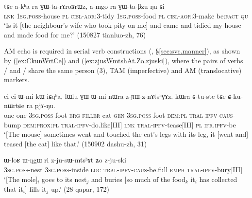 \begin{exe}
\ex \label{ex:GWtaBzu}
\gll  tɕe a-kʰa ra ɣɯ-ta-rɤroʁrɯz, 	a-mgo  ra ɣɯ-ta-βzu ŋu ɕi \\
\textsc{lnk} \textsc{1sg}.\textsc{poss}-house \textsc{pl} \textsc{cisl}-\textsc{aor}:3\flobv{}-tidy 
 \textsc{1sg}.\textsc{poss}-food \textsc{pl} \textsc{cisl}-\textsc{aor}:3\flobv{}-make be:\textsc{fact} \textsc{qu} \\ 
\glt `Is it [the neighbour's wife who took pity on me] and came and tidied my house and made food for me?'  (150827 tianluo-zh, 76)
\end{exe}

AM echo is required in serial verb constructions (\citealt[253--255]{jacques16complementation}, §\ref{sec:svc.manner}), as shown by (\ref{ex:CkunWrtCe}) and (\ref{ex:zjusWmtshAt.Zo.zjuski}), where the pairs of verbs  /  and   /  share the same person (3\flobv{}), TAM (imperfective) and AM (translocative) markers.

\begin{exe}
\ex \label{ex:CkunWrtCe}
\gll  ci ci ɯ-mi kɯ iɕqʰa, lɯlu ɣɯ ɯ-mi nɯra z-ɲɯ-z-nɤtsʰɣɤz. kɯra ɕ-tu-ste tɕe ɕ-ku-nɯrtɕe ra pjɤ-ŋu. \\
one one \textsc{3sg}.\textsc{poss}-foot \textsc{erg} \textsc{filler} cat \textsc{gen} \textsc{3sg}.\textsc{poss}-foot \textsc{dem}:\textsc{pl} \textsc{tral}-\textsc{ipfv}-\textsc{caus}-bump  \textsc{dem}:\textsc{prox}:\textsc{pl} \textsc{tral}-\textsc{ipfv}-do.like[III] \textsc{lnk}  \textsc{tral}-\textsc{ipfv}-tease[III] \textsc{pl} \textsc{ifr}.\textsc{ipfv}-be \\
\glt `[The mouse] sometimes went and touched the cat's legs with its leg, it [went and] teased [the cat] like that.' (150902 dashu-zh, 31)
\end{exe} 

\begin{exe}
\ex \label{ex:zjusWmtshAt.Zo.zjuski}
\gll    ɯ-loʁ ɯ-ŋgɯ ri z-ju-sɯ-mtsʰɤt ʑo z-ju-ski \\
\textsc{3sg}.\textsc{poss}-nest \textsc{3sg}.\textsc{poss}-inside \textsc{loc} \textsc{tral}-\textsc{ipfv}-\textsc{caus}-be.full \textsc{emph} \textsc{tral}-\textsc{ipfv}-bury[III] \\
\glt `[The mole]$_i$ goes to its nest$_j$ and buries [so much of the food$_k$ it$_i$ has collected that it$_i$] fills it$_j$ up.' (28-qapar, 172)
\end{exe} 

